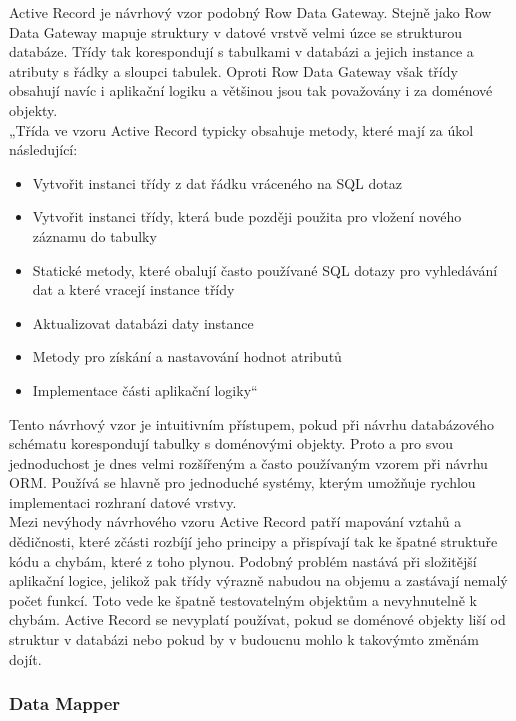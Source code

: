 \documentclass[ing,male,java,dept456]{diploma}						%
\begin{document}
Active Record je návrhový vzor podobný Row Data Gateway. Stejně jako Row Data Gateway mapuje struktury v datové vrstvě velmi úzce se strukturou databáze. Třídy tak korespondují s tabulkami v databázi a jejich instance a atributy s řádky a sloupci tabulek. Oproti Row Data Gateway však třídy obsahují navíc i aplikační logiku a většinou jsou tak považovány i za doménové objekty. \\
„Třída ve vzoru Active Record typicky obsahuje metody, které mají za úkol následující:
\begin{itemize}
\item Vytvořit instanci třídy z dat řádku vráceného na SQL dotaz
\item Vytvořit instanci třídy, která bude později použita pro vložení nového záznamu do tabulky
\item Statické metody, které obalují často používané SQL dotazy pro vyhledávání dat a které vracejí instance třídy
\item Aktualizovat databázi daty instance
\item Metody pro získání a nastavování hodnot atributů
\item Implementace části aplikační logiky“ \cite[str. 160]{fowler}
\end{itemize} 
Tento návrhový vzor je intuitivním přístupem, pokud při návrhu databázového schématu korespondují tabulky s doménovými objekty. Proto a pro svou jednoduchost je dnes velmi rozšířeným a často používaným vzorem při návrhu ORM. Používá se hlavně pro jednoduché systémy, kterým umožňuje rychlou implementaci rozhraní datové vrstvy. \\
Mezi nevýhody návrhového vzoru Active Record patří mapování vztahů a dědičnosti, které zčásti rozbíjí jeho principy a přispívají tak ke špatné struktuře kódu a chybám, které z toho plynou. Podobný problém nastává při složitější aplikační logice, jelikož pak třídy výrazně nabudou na objemu a zastávají nemalý počet funkcí. Toto vede ke špatně testovatelným objektům a nevyhnutelně k chybám. Active Record se nevyplatí používat, pokud se doménové objekty liší od struktur v databázi nebo pokud by v budoucnu mohlo k takovýmto změnám dojít.

\subsubsection{Data Mapper}
\end{document}

